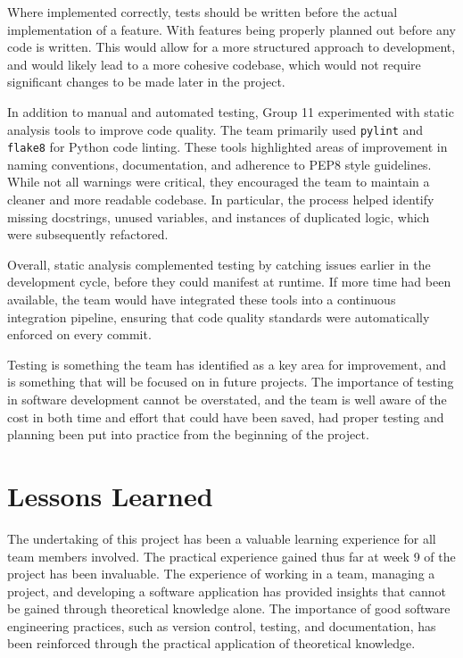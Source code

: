 \documentclass[conference]{IEEEtran}
\begin{document}
Where implemented correctly, tests should be written before the actual implementation of a feature. With features being properly planned out before any code is written. This would allow for a more structured approach to development, and would likely lead to a more cohesive codebase, which would not require significant changes to be made later in the project.

In addition to manual and automated testing, Group 11 experimented with static analysis tools to improve code quality. The team primarily used \texttt{pylint} and \texttt{flake8} for Python code linting. These tools highlighted areas of improvement in naming conventions, documentation, and adherence to PEP8 style guidelines. While not all warnings were critical, they encouraged the team to maintain a cleaner and more readable codebase. In particular, the process helped identify missing docstrings, unused variables, and instances of duplicated logic, which were subsequently refactored.

Overall, static analysis complemented testing by catching issues earlier in the development cycle, before they could manifest at runtime. If more time had been available, the team would have integrated these tools into a continuous integration pipeline, ensuring that code quality standards were automatically enforced on every commit.

Testing is something the team has identified as a key area for improvement, and is something that will be focused on in future projects. The importance of testing in software development cannot be overstated, and the team is well aware of the cost in both time and effort that could have been saved, had proper testing and planning been put into practice from the beginning of the project.

\section{Lessons Learned}
The undertaking of this project has been a valuable learning experience for all team members involved. The practical experience gained thus far at week 9 of the project has been invaluable. The experience of working in a team, managing a project, and developing a software application has provided insights that cannot be gained through theoretical knowledge alone. The importance of good software engineering practices, such as version control, testing, and documentation, has been reinforced through the practical application of theoretical knowledge. 
\end{document}
